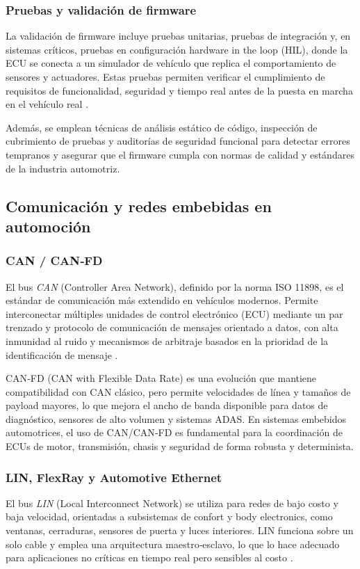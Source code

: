 \subsubsection{Pruebas y validación de firmware}
La validación de firmware incluye pruebas unitarias, pruebas de integración y, en sistemas críticos, pruebas en configuración hardware in the loop (HIL), donde la ECU se conecta a un simulador de vehículo que replica el comportamiento de sensores y actuadores. Estas pruebas permiten verificar el cumplimiento de requisitos de funcionalidad, seguridad y tiempo real antes de la puesta en marcha en el vehículo real \citep{AutomotiveEmbeddedHandbook}.

Además, se emplean técnicas de análisis estático de código, inspección de cubrimiento de pruebas y auditorías de seguridad funcional para detectar errores tempranos y asegurar que el firmware cumpla con normas de calidad y estándares de la industria automotriz.

\subsection{Comunicación y redes embebidas en automoción}
\subsubsection{CAN / CAN‑FD}
El bus \textit{CAN} (Controller Area Network), definido por la norma ISO 11898, es el estándar de comunicación más extendido en vehículos modernos. Permite interconectar múltiples unidades de control electrónico (ECU) mediante un par trenzado y protocolo de comunicación de mensajes orientado a datos, con alta inmunidad al ruido y mecanismos de arbitraje basados en la prioridad de la identificación de mensaje \citep{AutomotiveEmbeddedHandbook}.

CAN‑FD (CAN with Flexible Data Rate) es una evolución que mantiene compatibilidad con CAN clásico, pero permite velocidades de línea y tamaños de payload mayores, lo que mejora el ancho de banda disponible para datos de diagnóstico, sensores de alto volumen y sistemas ADAS. En sistemas embebidos automotrices, el uso de CAN/CAN‑FD es fundamental para la coordinación de ECUs de motor, transmisión, chasis y seguridad de forma robusta y determinista.

\subsubsection{LIN, FlexRay y Automotive Ethernet}
El bus \textit{LIN} (Local Interconnect Network) se utiliza para redes de bajo costo y baja velocidad, orientadas a subsistemas de confort y body electronics, como ventanas, cerraduras, sensores de puerta y luces interiores. LIN funciona sobre un solo cable y emplea una arquitectura maestro‑esclavo, lo que lo hace adecuado para aplicaciones no críticas en tiempo real pero sensibles al costo \citep{ AutomotiveEmbeddedHandbook}.

